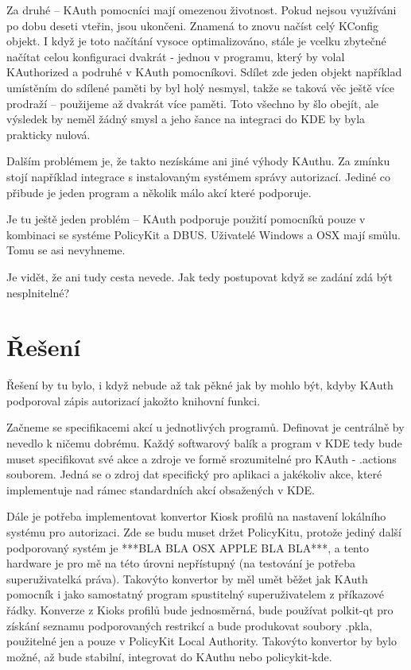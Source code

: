 Za druhé -- KAuth pomocníci mají omezenou životnost. Pokud nejsou využíváni po
dobu deseti vteřin, jsou ukončeni. Znamená to znovu načíst celý KConfig objekt.
I když je toto načítání vysoce optimalizováno, stále je vcelku zbytečné načítat
celou konfiguraci dvakrát - jednou v programu, který by volal KAuthorized
a podruhé v KAuth pomocníkovi. Sdílet zde jeden objekt například umístěním
do sdílené paměti by byl holý nesmysl, takže se taková věc ještě více prodraží
-- použijeme až dvakrát více paměti.
Toto všechno by šlo obejít, ale výsledek by neměl žádný smysl a jeho šance na
integraci do KDE by byla prakticky nulová.

Dalším problémem je, že takto nezískáme ani jiné výhody KAuthu. Za zmínku stojí
například integrace s instalovaným systémem správy autorizací. Jediné co přibude
je jeden program a několik málo akcí které podporuje.

Je tu ještě jeden problém -- KAuth podporuje použití pomocníků pouze
v kombinaci se systéme PolicyKit a DBUS. Uživatelé Windows a OSX mají smůlu.
Tomu se asi nevyhneme.

Je vidět, že ani tudy cesta nevede. Jak tedy postupovat když se zadání zdá být
nesplnitelné?

\section{Řešení}
Řešení by tu bylo, i když nebude až tak pěkné jak by mohlo být, kdyby KAuth
podporoval zápis autorizací jakožto knihovní funkci.

Začneme se specifikacemi akcí u jednotlivých programů. Definovat je centrálně
by nevedlo k ničemu dobrému. Každý softwarový balík a program v KDE tedy bude
muset specifikovat své akce a zdroje ve formě srozumitelné pro KAuth - .actions
souborem. Jedná se o zdroj dat specifický pro aplikaci a jakékoliv akce, které
implementuje nad rámec standardních akcí obsažených v KDE.

Dále je potřeba implementovat konvertor Kiosk profilů na nastavení lokálního
systému pro autorizaci. Zde se budu muset držet PolicyKitu, protože jediný další
podporovaný systém je ***BLA BLA OSX APPLE BLA BLA***, a tento hardware je pro
mě na této úrovni nepřístupný (na testování je potřeba superuživatelká práva).
Takovýto konvertor by měl umět běžet jak KAuth pomocník i jako samostatný
program spustitelný superuživatelem z příkazové řádky. Konverze z Kioks profilů
bude jednosměrná, bude používat polkit-qt pro získání seznamu podporovaných
restrikcí a bude produkovat soubory .pkla, použitelné jen a pouze v PolicyKit
Local Authority. Takovýto konvertor by bylo možné, až bude stabilní, integrovat
do KAuthu nebo policykit-kde.

